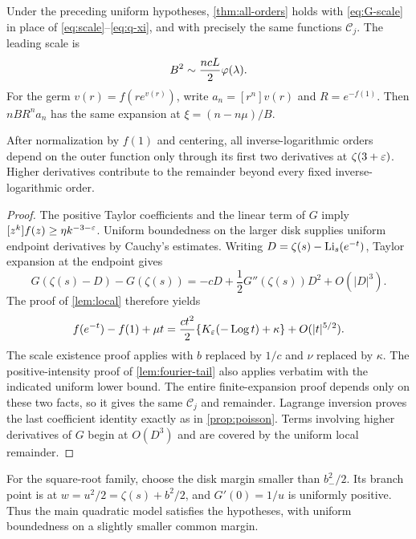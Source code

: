 \begin{theorem}
\label{thm:universality}
Under the preceding uniform hypotheses, \cref{thm:all-orders}
holds with \eqref{eq:G-scale} in place of
\eqref{eq:scale}--\eqref{eq:q-xi}, and with precisely the same
functions $\mathcal C_j$. The leading scale is
\begin{equation}\label{eq:G-leading}
 B^2\sim\frac{ncL}{2}\varphi(\lambda).
\end{equation}
For the germ $v(r)=f(re^{v(r)})$, write $a_n=[r^n]v(r)$ and
$R=e^{-f(1)}$. Then $nBR^n a_n$ has the same expansion at
$\xi=(n-n\mu)/B$.

After normalization by $f(1)$ and centering, all inverse-logarithmic
orders depend on the outer function only through its first two
derivatives at $\zeta(3+\varepsilon)$. Higher derivatives contribute to the
remainder beyond every fixed inverse-logarithmic order.
\end{theorem}

\begin{proof}
The positive Taylor coefficients and the linear term of $G$ imply
$[z^k]f(z)\ge\eta k^{-3-\varepsilon}$. Uniform boundedness on the larger
disk supplies uniform endpoint derivatives by Cauchy's estimates.
Writing $D=\zeta(s)-\operatorname{Li}_s(e^{-t})$, Taylor expansion at the endpoint
gives
\[
 G(\zeta(s)-D)-G(\zeta(s))
 =-cD+\frac12G''(\zeta(s))D^2+O(|D|^3).
\]
The proof of \cref{lem:local} therefore yields
\[
 f(e^{-t})-f(1)+\mu t
  =\frac{ct^2}{2}\{K_\varepsilon(-\operatorname{Log} t)+\kappa\}
                                      +O(|t|^{5/2}).
\]
The scale existence proof applies with $b$ replaced by $1/c$ and
$\nu$ replaced by $\kappa$. The positive-intensity proof of
\cref{lem:fourier-tail} also applies verbatim with the indicated
uniform lower bound. The entire finite-expansion proof depends only
on these two facts, so it gives the same $\mathcal C_j$ and remainder.
Lagrange inversion proves the last coefficient identity exactly as in
\cref{prop:poisson}. Terms involving higher derivatives of $G$ begin
at $O(D^3)$ and are covered by the uniform local remainder.
\end{proof}

For the square-root family, choose the disk margin smaller than
$b_-^2/2$. Its branch point is at
$w=u^2/2=\zeta(s)+b^2/2$, and $G'(0)=1/u$ is uniformly positive.
Thus the main quadratic model satisfies the hypotheses, with uniform
boundedness on a slightly smaller common margin.

